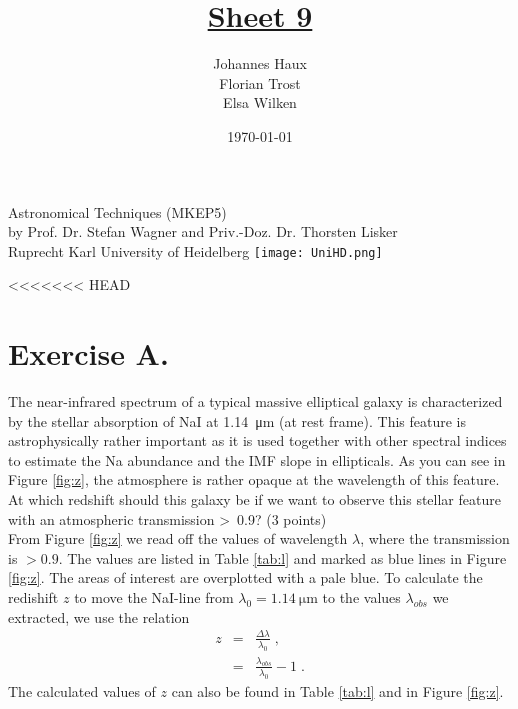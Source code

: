 \documentclass[11pt,a4paper,twoside]{article}
\title{\LARGE \underline {Sheet 9}}
\author{Johannes Haux \\ Florian Trost \\ Elsa Wilken}
\date{\today}
\begin{document}
\maketitle
\thispagestyle{empty}

\begin{center}
  Astronomical Techniques (MKEP5) \\
  \baselineskip35pt
  by Prof. Dr. Stefan Wagner and Priv.-Doz. Dr. Thorsten Lisker \\
  \baselineskip60pt
  Ruprecht Karl University of Heidelberg
\vskip 40pt
\texttt{[image: UniHD.png]}

\end{center}

\newpage
\setcounter{page}{1}		%

<<<<<<< HEAD
\section*{Exercise A.}

The near-infrared spectrum of a typical massive elliptical galaxy is
characterized by the stellar absorption of NaI at \SI{1.14}{\micro\meter} (at
rest frame). This feature is astrophysically rather important as it is used
together with other spectral indices to estimate the Na abundance and the IMF
slope in ellipticals.  As you can see in Figure \ref{fig:z}, the atmosphere is
rather opaque at the wavelength of this feature. At which redshift should this
galaxy be if we want to observe this stellar feature with an atmospheric
transmission \textgreater \ 0.9? (3 points)\\

From Figure \ref{fig:z} we read off the values of wavelength $\lambda$, where
the transmission is $> 0.9$. The values are listed in Table \ref{tab:l} and
marked as blue lines in Figure \ref{fig:z}. The areas of interest are
overplotted with a pale blue. To calculate the redishift $z$ to move the
NaI-line from $\lambda_0=\SI{1.14}{\micro\meter}$ to the values $\lambda_{obs}$
we extracted, we use the relation
\begin{eqnarray}
    z   &=& \frac{\Delta \lambda}{\lambda_0}\;, \\
        &=& \frac{\lambda_{obs}}{\lambda_0} -1\;.
\end{eqnarray}
The calculated values of $z$ can also be found in Table \ref{tab:l} and in 
Figure \ref{fig:z}.

\end{document}

